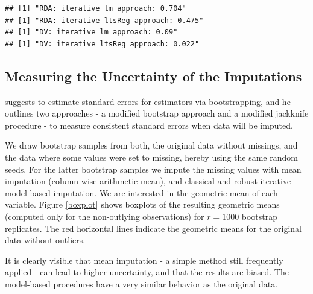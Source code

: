 \documentclass{scrartcl}\usepackage[]{graphicx}\usepackage[]{color}
\makeatletter
\newenvironment{kframe}{%
 \def\at@end@of@kframe{}%
 \ifinner\ifhmode%
  \def\at@end@of@kframe{\end{minipage}}%
  \begin{minipage}{\columnwidth}%
 \fi\fi%
 \def\FrameCommand##1{\hskip\@totalleftmargin \hskip-\fboxsep
 \colorbox{shadecolor}{##1}\hskip-\fboxsep
     \hskip-\linewidth \hskip-\@totalleftmargin \hskip\columnwidth}%
 \MakeFramed {\advance\hsize-\width
   \@totalleftmargin\z@ \linewidth\hsize
   \@setminipage}}%
 {\par\unskip\endMakeFramed%
 \at@end@of@kframe}
\newenvironment{knitrout}{}{} %
\makeatother
\begin{document}
\begin{knitrout}
\color{fgcolor}\begin{kframe}
\begin{verbatim}
## [1] "RDA: iterative lm approach: 0.704"
## [1] "RDA: iterative ltsReg approach: 0.475"
## [1] "DV: iterative lm approach: 0.09"
## [1] "DV: iterative ltsReg approach: 0.022"
\end{verbatim}
\end{kframe}
\end{knitrout}

\subsection{Measuring the Uncertainty of the Imputations}

\cite{Little87} suggests to estimate standard errors for estimators via bootstrapping,
and he outlines two approaches - a modified bootstrap approach and 
a modified jackknife procedure - to measure consistent 
standard errors when data will be imputed.

We draw bootstrap samples from both, the original data without missings,
and the data where some values were set to missing, hereby using the same
random seeds.
For the latter bootstrap samples we impute the missing values
with mean imputation (column-wise arithmetic mean), and classical and
robust iterative model-based imputation.
We are interested in the geometric mean of each variable.
Figure \ref{boxplot} shows boxplots of the resulting geometric means
(computed only for the non-outlying observations)
for $r=1000$ bootstrap replicates.
The red horizontal lines indicate the geometric means for the original data
without outliers.

It is clearly visible that mean imputation - a simple method still frequently
applied - can lead to higher uncertainty,
and that the results are biased.
The model-based procedures have a very similar behavior as the original data.

\end{document}
